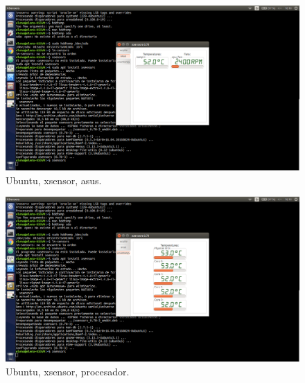 \begin{figure}[H] 
	\centering
	\includegraphics[width=14.7cm]{./img/extra_1_4.png} 	
	\caption{Ubuntu, xsensor, asus.} \label{fig:extra_1_4}
\end{figure}

\begin{figure}[H] 
	\centering
	\includegraphics[width=14.7cm]{./img/extra_1_5.png} 	
	\caption{Ubuntu, xsensor, procesador.} \label{fig:extra_1_5}
\end{figure}





